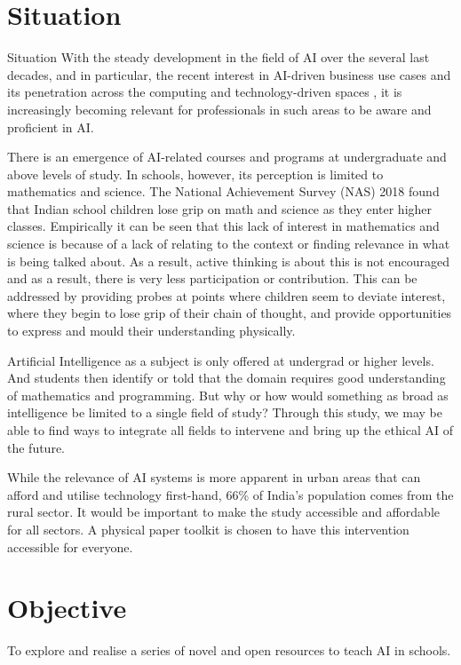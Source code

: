 \documentclass	[a4paper,11pt, hidelinks]{article}
\theoremstyle{definition}
\begin{document}
\section{Situation}
Situation
With the steady development in the field of AI over the several last decades, and in particular, the recent interest in AI-driven business use cases and its penetration across the computing and technology-driven spaces \cite{Anexecut56:online}, it is increasingly becoming relevant for professionals in such areas to be aware and proficient in AI. 

There is an emergence of AI-related courses and programs at undergraduate and above levels of study. In schools, however, its perception is limited to mathematics and science. The National Achievement Survey (NAS) 2018 found that Indian school children lose grip on math and science as they enter higher classes. \cite{educatio96:online} Empirically it can be seen that this lack of interest in mathematics and science is because of a lack of relating to the context or finding relevance in what is being talked about. As a result, active thinking is about this is not encouraged and as a result, there is very less participation or contribution. This can be addressed by providing probes at points where children seem to deviate interest, where they begin to lose grip of their chain of thought, and provide opportunities to express and mould their understanding physically.

Artificial Intelligence as a subject is only offered at undergrad or higher levels.  And students then identify or told that the domain requires good understanding of mathematics and programming. But why or how would something as broad as intelligence be limited to a single field of study? Through this study, we may be able to find ways to integrate all fields to intervene and bring up the ethical AI of the future.

While the relevance of AI systems is more apparent in urban areas that can afford and utilise technology first-hand, 66\% of India’s population comes from the rural sector. It would be important to make the study accessible and affordable for all sectors. A physical paper toolkit is chosen to have this intervention accessible for everyone. 

\section{Objective}
To explore and realise a series of novel and open resources to teach AI in schools. 
\end{document}
